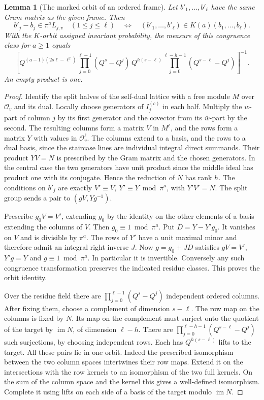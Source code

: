 \documentclass[a4paper,11pt]{article}
\newtheorem{lemma}[proposition]{Lemma}
\theoremstyle{definition}
\theoremstyle{remark}
\numberwithin{equation}{section}
\begin{document}
\begin{lemma}[The marked orbit of an ordered frame]\leavevmode
\label{lem:flagmarked264}
Let \(b'_1,\ldots,b'_\ell\) have the same Gram matrix as the
given frame. Then
\[
 b'_j-b_j\in\pi^a L_{j,v}\quad(1\le j\le\ell)
 \quad\Longleftrightarrow\quad
    (b'_1,\ldots,b'_\ell)\in K(a)(b_1,\ldots,b_\ell).
\]
With the \(K\)-orbit assigned invariant probability, the
measure of this congruence class for \(a\ge1\) equals
\[
 \left[
 Q^{(a-1)(2s\ell-\ell^2)}\!
 \prod_{j=0}^{\ell-1}(Q^s-Q^j)\,
 Q^{h(s-\ell)}
 \prod_{j=0}^{\ell-h-1}(Q^{s-\ell}-Q^j)
 \right]^{-1}.
\]
An empty product is one.
\end{lemma}
\begin{proof}
Identify the split halves of the self-dual lattice with a free
module \(M\) over \(\mathcal O_v\) and its dual. Locally choose
generators of \(I_j^{(c)}\) in each half. Multiply the \(w\)-part
of column \(j\) by its first generator and the covector from
its \(\bar w\)-part by the second. The resulting columns form
a matrix \(V\) in \(M^\ell\), and the rows form a matrix \(Y\)
with values in \(\mathcal O_v^\ell\). The columns extend to a
basis, and the rows to a dual basis, since the staircase lines
are individual integral direct summands. Their product \(YV=N\)
is prescribed by the Gram matrix and the chosen generators.
In the central case the two generators have unit product since
the middle ideal has product one with its conjugate. Hence the
reduction of \(N\) has rank \(h\). The conditions on \(b'_j\)
are exactly \(V'\equiv V,\ Y'\equiv Y\bmod\pi^a\), with
\(Y'V'=N\). The split group sends a pair to
\((gV,Yg^{-1})\).

Prescribe \(g_0V=V'\), extending \(g_0\) by the identity on
the other elements of a basis extending the columns of \(V\).
Then \(g_0\equiv1\bmod\pi^a\). Put \(D=Y-Y'g_0\).
It vanishes on \(V\) and is divisible by \(\pi^a\).
The rows of \(Y'\) have a unit maximal minor and therefore
admit an integral right inverse \(J\). Now \(g=g_0+JD\) satisfies
\(gV=V'\), \(Y'g=Y\) and \(g\equiv1\bmod\pi^a\). In particular
it is invertible. Conversely any such congruence transformation
preserves the indicated residue classes. This proves the
orbit identity.

Over the residue field there are
\(\prod_{j=0}^{\ell-1}(Q^s-Q^j)\) independent ordered columns.
After fixing them, choose a complement of dimension \(s-\ell\).
The row map on the columns is fixed by \(N\). Its map on the
complement must surject onto the quotient of the target by
\(\operatorname{im}N\), of dimension \(\ell-h\). There are
\(\prod_{j=0}^{\ell-h-1}(Q^{s-\ell}-Q^j)\) such surjections,
by choosing independent rows. Each has \(Q^{h(s-\ell)}\)
lifts to the target. All these pairs lie in one orbit. Indeed
the prescribed isomorphism between the two column spaces
intertwines their row maps. Extend it on the intersections with
the row kernels to an isomorphism of the two full kernels.
On the sum of the column space and the kernel this gives a
well-defined isomorphism. Complete it using lifts on each side
of a basis of the target modulo \(\operatorname{im}N\).


\end{proof}
\end{document}
